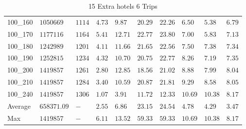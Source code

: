 \begin{center}
\begin{table}[]
\begin{tabular}{|lll|l|l|ll|lll|}
100\_160 & $1050669  $ & $1114$ & $4.73$ & $9.87 $  & $20.29$    & $22.26$   & $6.50 $ & $5.38 $  & $6.79$ \\
100\_170 & $1177116  $ & $1164$ & $5.41$ & $12.71$  & $22.77$    & $23.80$   & $7.00 $ & $5.83 $  & $7.13$ \\
100\_180 & $1242989  $ & $1201$ & $4.11$ & $11.66$  & $21.65$    & $22.56$   & $7.50 $ & $7.38 $  & $7.34$ \\
100\_190 & $1252815  $ & $1234$ & $4.32$ & $10.70$  & $20.75$    & $22.77$   & $8.26 $ & $7.19 $  & $7.35$ \\
100\_200 & $1419857  $ & $1261$ & $2.80$ & $12.85$  & $18.56$    & $21.02$   & $8.88 $ & $7.99 $  & $8.04$ \\
100\_210 & $1419857  $ & $1284$ & $3.40$ & $10.59$  & $20.87$    & $21.81$   & $9.29 $ & $8.58 $  & $8.05$ \\
100\_240 & $1419857  $ & $1306$ & $1.07$ & $3.91 $  & $11.72$    & $12.33$   & $10.69$ & $10.38$  & $8.17$ \\
\hline
Average  & $658371.09$ & $-   $ & $2.55$ & $6.86 $  & $23.15$    & $24.54$   & $4.78 $ & $4.29 $  & $3.47$ \\
Max      & $1419857  $ & $-   $ & $6.11$ & $13.52$  & $59.33$    & $59.33$   & $10.69$ & $10.38$  & $8.17$ \\
\hline
\end{tabular}
\caption{15 Extra hotels 6 Trips}
\label{15-6}
\end{table}
\end{center}
